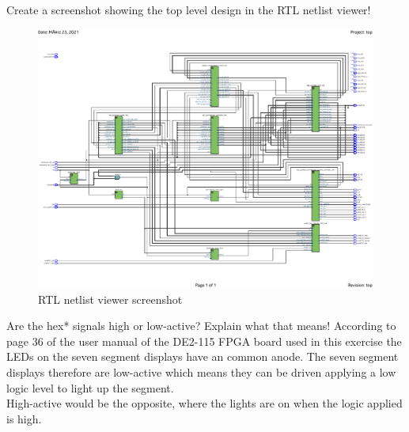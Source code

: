 \documentclass[10pt,a4paper,titlepage,oneside]{article}
\begin{document}
\maketitle



\begin{qa}{Create a screenshot showing the top level design in the RTL netlist viewer!}
	\begin{figure}[h!]
		\centering
		\includegraphics[width=1.0\linewidth]{dia/RTL View.pdf}
		\caption{RTL netlist viewer screenshot}
	\end{figure}
\end{qa}



\begin{qa}{Are the \textsf{hex*} signals high or low-active? Explain what that means!}
According to page 36 of the user manual of the DE2-115 FPGA board used in this exercise the LEDs on the seven segment displays have an common anode. The seven segment displays therefore are low-active which means they can be driven applying a low logic level to light up the segment.\\
High-active would be the opposite, where the lights are on when the logic applied is high.
\end{qa}
\end{document}
